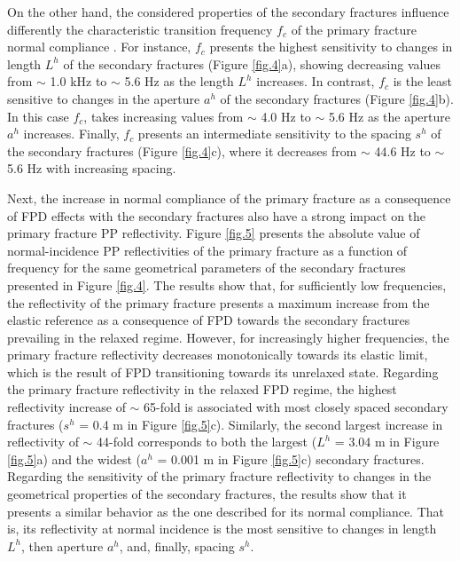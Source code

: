 \documentclass[draft]{agujournal2019}
\begin{document}
On the other hand, the considered properties of the secondary fractures influence differently the characteristic transition frequency $f_c$ of the primary fracture normal compliance . For instance, $f_c$ presents the highest sensitivity to changes in length $L^h$ of the secondary fractures (Figure \ref{fig.4}a), showing decreasing values from $\sim$ 1.0 kHz to $\sim$ 5.6 Hz as the length $L^h$ increases. In contrast, $f_c$ is the least sensitive to changes in the aperture $a^h$ of the secondary fractures (Figure \ref{fig.4}b). In this case $f_c$, takes increasing values from  $\sim$ 4.0 Hz to  $\sim$ 5.6 Hz as the aperture $a^h$ increases. Finally, $f_c$ presents an intermediate sensitivity to the spacing $s^h$ of the secondary fractures (Figure \ref{fig.4}c), where it decreases from  $\sim$ 44.6 Hz to  $\sim$ 5.6 Hz with increasing spacing.

Next, the increase in normal compliance of the primary fracture as a consequence of FPD effects with the secondary fractures also have a strong impact on the primary fracture PP reflectivity. Figure \ref{fig.5} presents the absolute value of normal-incidence PP reflectivities of the primary fracture as a function of frequency for the same geometrical parameters of the secondary fractures presented in Figure \ref{fig.4}.
The results show that, for sufficiently low frequencies, the reflectivity of the primary fracture presents a maximum increase from the elastic reference as a consequence of FPD towards the secondary fractures prevailing in the relaxed regime. However, for increasingly higher frequencies, the primary fracture reflectivity  decreases monotonically towards its elastic limit, which is the result of FPD transitioning towards its unrelaxed state. Regarding the primary fracture reflectivity in the relaxed FPD regime, the highest reflectivity increase of $\sim$ 65-fold is associated with most closely spaced secondary fractures ($s^h$ = 0.4 m in Figure \ref{fig.5}c). Similarly, the second largest increase in reflectivity of $\sim$ 44-fold corresponds to both the largest ($L^h$ = 3.04 m in Figure \ref{fig.5}a) and the widest ($a^h$ = 0.001 m in Figure \ref{fig.5}c) secondary fractures.
Regarding the sensitivity of the primary fracture reflectivity to changes in the geometrical properties of the secondary fractures, the results show that it presents a similar behavior as the one described for its normal compliance. 
That is, its reflectivity at normal incidence is the most sensitive to changes in length $L^h$, then aperture $a^h$, and, finally, spacing $s^h$. 
\end{document}
